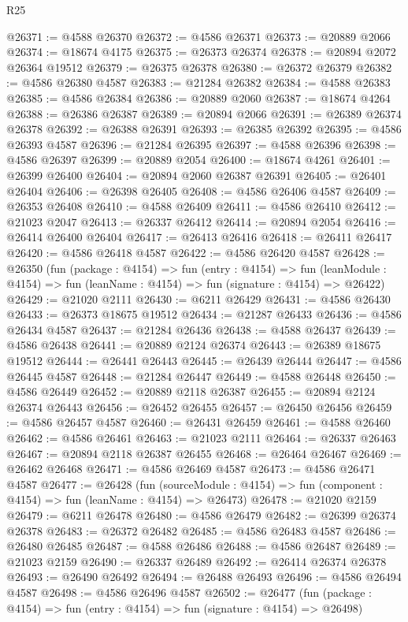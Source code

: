\begin{lexlean}{R25}
\begin{coremodule}
@26371 := @4588 @26370
@26372 := @4586 @26371
@26373 := @20889 @2066
@26374 := @18674 @4175
@26375 := @26373 @26374
@26378 := @20894 @2072 @26364 @19512
@26379 := @26375 @26378
@26380 := @26372 @26379
@26382 := @4586 @26380 @4587
@26383 := @21284 @26382
@26384 := @4588 @26383
@26385 := @4586 @26384
@26386 := @20889 @2060
@26387 := @18674 @4264
@26388 := @26386 @26387
@26389 := @20894 @2066
@26391 := @26389 @26374 @26378
@26392 := @26388 @26391
@26393 := @26385 @26392
@26395 := @4586 @26393 @4587
@26396 := @21284 @26395
@26397 := @4588 @26396
@26398 := @4586 @26397
@26399 := @20889 @2054
@26400 := @18674 @4261
@26401 := @26399 @26400
@26404 := @20894 @2060 @26387 @26391
@26405 := @26401 @26404
@26406 := @26398 @26405
@26408 := @4586 @26406 @4587
@26409 := @26353 @26408
@26410 := @4588 @26409
@26411 := @4586 @26410
@26412 := @21023 @2047
@26413 := @26337 @26412
@26414 := @20894 @2054
@26416 := @26414 @26400 @26404
@26417 := @26413 @26416
@26418 := @26411 @26417
@26420 := @4586 @26418 @4587
@26422 := @4586 @26420 @4587
@26428 := @26350
    (fun (package : @4154) =>
    fun (entry : @4154) =>
    fun (leanModule : @4154) => fun (leanName : @4154) => fun (signature : @4154) => @26422)
@26429 := @21020 @2111
@26430 := @6211 @26429
@26431 := @4586 @26430
@26433 := @26373 @18675 @19512
@26434 := @21287 @26433
@26436 := @4586 @26434 @4587
@26437 := @21284 @26436
@26438 := @4588 @26437
@26439 := @4586 @26438
@26441 := @20889 @2124 @26374
@26443 := @26389 @18675 @19512
@26444 := @26441 @26443
@26445 := @26439 @26444
@26447 := @4586 @26445 @4587
@26448 := @21284 @26447
@26449 := @4588 @26448
@26450 := @4586 @26449
@26452 := @20889 @2118 @26387
@26455 := @20894 @2124 @26374 @26443
@26456 := @26452 @26455
@26457 := @26450 @26456
@26459 := @4586 @26457 @4587
@26460 := @26431 @26459
@26461 := @4588 @26460
@26462 := @4586 @26461
@26463 := @21023 @2111
@26464 := @26337 @26463
@26467 := @20894 @2118 @26387 @26455
@26468 := @26464 @26467
@26469 := @26462 @26468
@26471 := @4586 @26469 @4587
@26473 := @4586 @26471 @4587
@26477 := @26428
    (fun (sourceModule : @4154) => fun (component : @4154) => fun (leanName : @4154) => @26473)
@26478 := @21020 @2159
@26479 := @6211 @26478
@26480 := @4586 @26479
@26482 := @26399 @26374 @26378
@26483 := @26372 @26482
@26485 := @4586 @26483 @4587
@26486 := @26480 @26485
@26487 := @4588 @26486
@26488 := @4586 @26487
@26489 := @21023 @2159
@26490 := @26337 @26489
@26492 := @26414 @26374 @26378
@26493 := @26490 @26492
@26494 := @26488 @26493
@26496 := @4586 @26494 @4587
@26498 := @4586 @26496 @4587
@26502 := @26477 (fun (package : @4154) => fun (entry : @4154) => fun (signature : @4154) => @26498)

\end{coremodule}
\end{lexlean}
